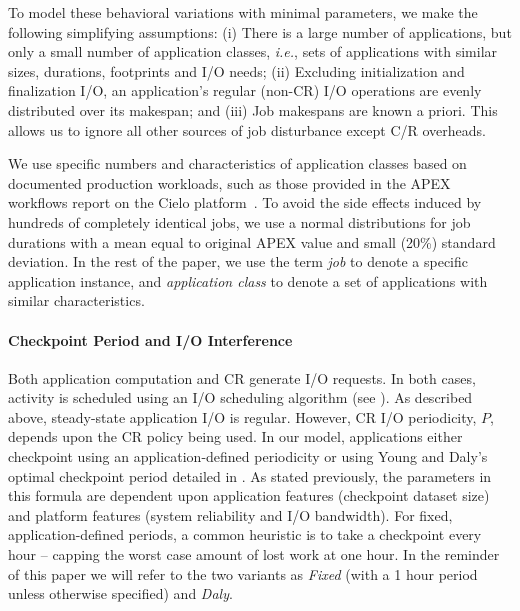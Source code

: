 \documentclass[conference,nofonttune]{IEEEtran}
\newcommand{\ie}[0]{\emph{i.e.}\xspace}
\begin{document}
To model these behavioral variations with minimal parameters, we make the following
simplifying assumptions: (i) There is a large number of applications, but only a small number of application
  classes, \ie, sets of applications with similar sizes, durations, footprints and
  I/O needs; (ii) Excluding initialization and finalization I/O, an application's regular
  (non-CR) I/O operations are evenly distributed over its makespan; and (iii) Job makespans are known a priori. This allows us to ignore all other
  sources of job disturbance except C/R overheads.

We use specific numbers and characteristics of application classes based on
documented production workloads, such as those provided in the APEX workflows report
on the Cielo platform~\cite{apex2016}.  To avoid the side effects induced by
hundreds of completely identical jobs, we use a normal distributions for job
durations with a mean equal to original APEX value and small (20\%) standard
deviation.  In the rest of the paper, we use the term \emph{job} to denote
a specific application instance, and \emph{application class} to denote a set
of applications with similar characteristics.

\paragraph*{Checkpoint Period and I/O Interference}

Both application computation and CR generate I/O requests.  In both cases, activity
is scheduled using an I/O scheduling algorithm (see ). As
described above, steady-state application I/O is regular. However, CR I/O
periodicity, $P$, depends upon the CR policy being used.  In our model, applications
either checkpoint using an application-defined periodicity or using Young and
Daly's~\cite{young74,daly04} optimal checkpoint period detailed in
. As stated previously, the parameters in this formula are dependent
upon application features (checkpoint dataset size) and platform features (system
reliability and I/O bandwidth).  For fixed, application-defined periods, a common
heuristic is to take a checkpoint every hour -- capping the worst case amount of lost
work at one hour.  In the reminder of this paper we will refer to the two variants as
\emph{Fixed} (with a 1 hour period unless otherwise specified) and \emph{Daly}.
\end{document}
